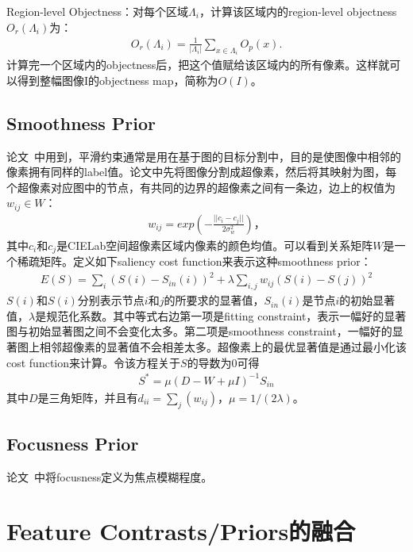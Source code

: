 \documentclass[12pt]{article}
\begin{document}
Region-level Objectness：对每个区域$\Lambda_i$，计算该区域内的region-level objectness $O_r(\Lambda_i)$为：
\begin{align}
O_r(\Lambda_i) = \frac{1}{|\Lambda_i|}\sum_{x \in \Lambda_i} O_p(x).
\end{align}
计算完一个区域内的objectness后，把这个值赋给该区域内的所有像素。这样就可以得到整幅图像I的objectness map，简称为$O(I)$。

\subsection{Smoothness Prior}

论文~\cite{yang2013graph}中用到，平滑约束通常是用在基于图的目标分割中，目的是使图像中相邻的像素拥有同样的label值。论文中先将图像分割成超像素，然后将其映射为图，每个超像素对应图中的节点，有共同的边界的超像素之间有一条边，边上的权值为$w_{ij} \in W$：
\begin{align}
w_{ij} = exp\left(-\frac{||c_i-c_j||}{2\sigma_w^2}\right)，
\end{align}
其中$c_i$和$c_j$是CIELab空间超像素区域内像素的颜色均值。可以看到关系矩阵$W$是一个稀疏矩阵。定义如下saliency cost function来表示这种smoothness prior：
\begin{align}
E(S) = \sum_i(S(i)-S_{in}(i))^2+\lambda\sum_{i,j}w_{ij}(S(i)-S(j))^2
\end{align}
$S(i)$和$S(i)$分别表示节点$i$和$j$的所要求的显著值，$S_{in}(i)$是节点$i$的初始显著值，$\lambda$是规范化系数。其中等式右边第一项是fitting constraint，表示一幅好的显著图与初始显著图之间不会变化太多。第二项是smoothness constraint，一幅好的显著图上相邻超像素的显著值不会相差太多。超像素上的最优显著值是通过最小化该cost function来计算。令该方程关于$S$的导数为0可得
\begin{align}
S^* = \mu (D-W+\mu I)^{-1}S_{in}
\end{align}
其中$D$是三角矩阵，并且有$d_{ii} = \sum_j (w_{ij})$，$\mu = 1/(2\lambda)$。

\subsection{Focusness Prior}

论文~\cite{jiangpeng2013salient}中将focusness定义为焦点模糊程度。

\section{Feature Contrasts/Priors的融合}
\end{document}
